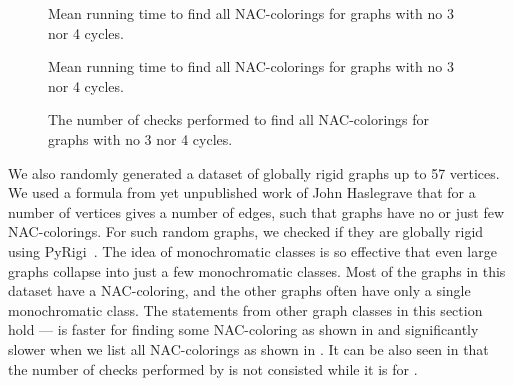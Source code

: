 \begin{figure}[p]
	\centering
	\scalebox{0.5}{}
	\caption[Mean runtime for graphs with no 3 nor 4 cycles (some).]{
		Mean running time to find all NAC-colorings for graphs with no 3 nor 4 cycles.}%
	\label{fig:graph_count_no_3_nor_4_cycles_first_runtime}
\end{figure}%
\begin{figure}[p]
	\centering
	\scalebox{0.5}{}
	\caption[Mean runtime for graphs with no 3 nor 4 cycles (all).]{
		Mean running time to find all NAC-colorings for graphs with no 3 nor 4 cycles.}%
	\label{fig:graph_count_no_3_nor_4_cycles_all_runtime}
\end{figure}%
\begin{figure}[p]
	\centering
	\scalebox{0.5}{}
	\caption[Checks performed for graphs with no 3 nor 4 cycles (all).]{
		The number of checks performed to find all NAC-colorings for graphs with no 3 nor 4 cycles.}%
	\label{fig:graph_count_no_3_nor_4_cycles_all_checks}
\end{figure}%


We also randomly generated a dataset of globally rigid graphs
up to 57 vertices.
We used a formula from yet unpublished work of John Haslegrave
that for a number of vertices gives a number of edges,
such that graphs have no or just few NAC-colorings.
For such random graphs, we checked if they are globally rigid using PyRigi~\cite{pyrigi}.
%
The idea of monochromatic classes is so effective
that even large graphs collapse into just a few monochromatic classes.
Most of the graphs in this dataset have a NAC-coloring,
and the other graphs often have only a single monochromatic class.
The statements from other graph classes in this section hold
--- \NaiveCycles{} is faster for finding some NAC-coloring
as shown in 
and significantly slower when we list all NAC-colorings
as shown in .
It can be also seen in 
that the number of checks performed
by \NaiveCycles{} is not consisted while it is for \Subgraphs{}.

